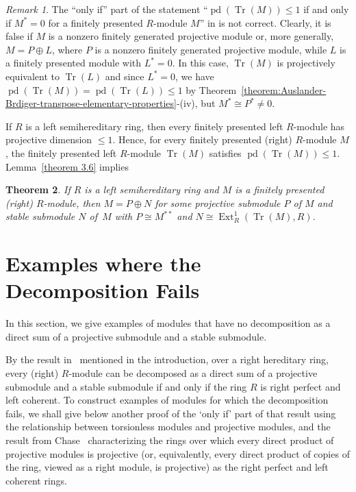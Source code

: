 \documentclass[11pt,a4paper]{amsart}
\theoremstyle{plain}
\newtheorem{theorem}{Theorem}[section]
\theoremstyle{definition}
\theoremstyle{remark}
\newtheorem{remark}[theorem]{Remark}
\newcommand{\Ext}{\operatorname{Ext}}
\newcommand{\pd}{\operatorname{pd}}
\newcommand{\Transpose}{\operatorname{Tr}}
\begin{document}
\begin{remark}
The ``only if'' part of the statement ``$\pd(\Transpose(M))\leq 1$  if and only if $M^*=0$ for a finitely presented $R$-module $M$'' in  \cite[Lemma 6.1-(1)]{Hugel-Bazzoni:TTFTriplesInFunctorCategories} is not correct.
Clearly, it is false if $ M $ is a nonzero finitely generated projective module  or, more generally, $M=P \oplus L$, where $P$ is a nonzero finitely generated projective module, while $L$ is a finitely presented module with $L^*=0$. In this case, $ \Transpose(M) $ is projectively equivalent to $ \Transpose(L) $ and since $ L^*=0 $, we have $ \pd(\Transpose(M)) =   \pd(\Transpose(L)) \leq 1 $ by Theorem~\ref{theorem:Auslander-Brdiger-transpose-elementary-properties}-(iv), but $M^* \cong P^* \neq 0$.
\end{remark}

If $R$ is a left semihereditary ring, then every finitely presented left $R$-module has projective dimension $\leq 1$. Hence, for every finitely presented (right) $R$-module $M$, the finitely presented left $R$-module $\Transpose(M)$ satisfies $\pd(\Transpose(M))\leq 1$. Lemma~\ref{theorem 3.6} implies

\begin{theorem}\label{Ex:left semihereditary right module}
If $R$ is a \emph{left semihereditary} ring and $M$ is a \emph{finitely presented (right)} $R$-module, then $M=P\oplus N$ for some \emph{projective} submodule $P$ of $M$ and \emph{stable} submodule $N$ of~$M$ with
$
P\cong M^{**} $ and $ N\cong \Ext^1_R(\Transpose(M),R)
$.
\end{theorem}

\section{Examples where the Decomposition Fails}\label{Sec:Examples_where_the_decomposition_fails}

In this section, we give examples of modules that have no decomposition as a direct sum of a projective submodule and a stable submodule.

By the result in~\cite{Zangurashvili:AStructureTheoremForLeftModulesOverLeftHereditaryLeftPerfectRightCoherentRings} mentioned in the introduction, over a right hereditary ring,  every (right) $ R $-module can be decomposed as a direct sum of a projective submodule and a stable submodule if and only if the ring $ R $ is right perfect and left coherent. To construct {examples of modules} for which the decomposition fails, we shall give below another proof of the `only if' part of that result using the relationship between torsionless modules and projective modules, and the result from Chase~\cite[Theorem 3.3]{Chase:DirectProductsOfModules} characterizing the rings over which every direct product of projective modules is projective (or, {equivalently, every direct product of copies of the ring, viewed as a right module, is projective}) as the right perfect and left coherent rings.
\end{document}
